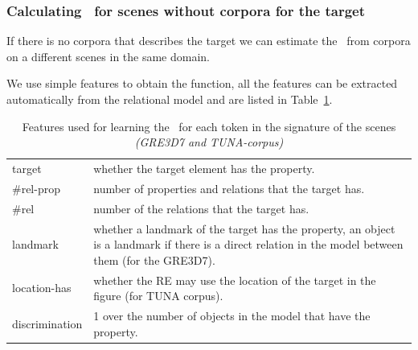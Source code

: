 \subsubsection{Calculating \puse\ for scenes without corpora for the
  target} \label{subsec:learning}

If there is no corpora that describes the target we can estimate the
\puse~from corpora on a different scenes in the same domain.

We use simple features to obtain the function, all the features can be
extracted automatically from the relational model and are listed in
Table~\ref{features}.

\begin{small}
\begin{table}[h!]
\begin{center}
\begin{tabular}{|l|p{10cm}|}
\hline
target & whether the target element has the property. \\
\#rel-prop & number of properties and relations that the target has.\\
\#rel & number of the relations that the target has. \\
landmark & whether a landmark of the target has the property, an object is a landmark if there is a direct relation in the model 
between them (for the GRE3D7).\\
location-has & whether the RE may use the location of the target in the figure (for TUNA corpus).\\
discrimination & 1 over the number of objects in the model that have the property.  \\
\hline
\end{tabular}
\caption{Features used for learning the \puse ~for each token in the signature of the scenes \textit{(GRE3D7 and TUNA-corpus)} \label{features}}
\end{center}
\end{table}
\end{small}

